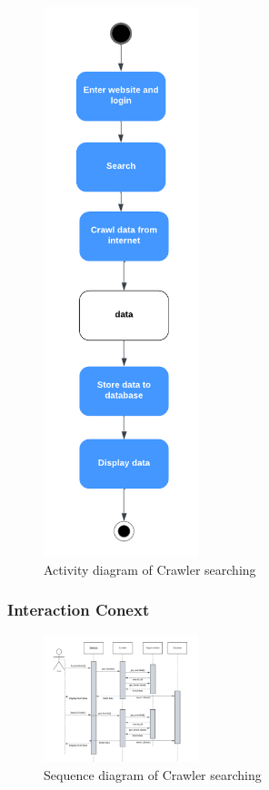 \documentclass[conference]{IEEEtran}
\begin{document}
\begin{figure}[htbp]
	\centerline{\includegraphics[width=0.4\textwidth]{image/crawler activity1.pdf}}
	\caption{Activity diagram of Crawler searching }
	\label{activity1}
\end{figure}


\subsubsection{\textbf{Interaction Conext }}

\begin{figure}[htbp]
	\centerline{\includegraphics[width=0.4\textwidth]{image/crawler searching sequence1.pdf}}
	\caption{Sequence diagram of Crawler searching }
	\label{sequence1}
\end{figure}
\end{document}
